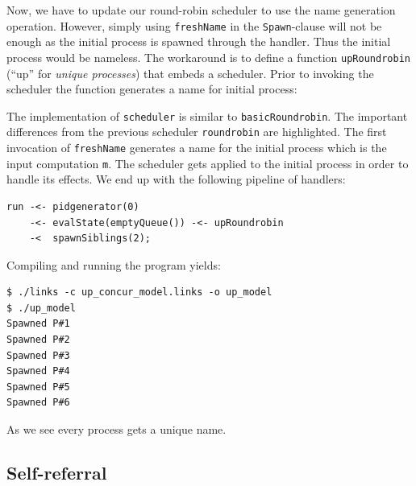 \documentclass[12pt,mscres,cdtppar,twoside,openright,logo,rightchapter,normalheadings]{infthesis}
\newcommand{\snippet}[1]{}
\theoremstyle{definition}
\begin{document}

Now, we have to update our round-robin scheduler to use the name
generation operation. However, simply using \lstinline$freshName$ in
the \lstinline$Spawn$-clause will not be enough as the initial process
is spawned through the handler. Thus the initial process would be
nameless. The workaround is to define a function
\lstinline$upRoundrobin$ (``up'' for \emph{unique processes}) that
embeds a scheduler. Prior to invoking the scheduler the function
generates a name for initial process:
%

%
The implementation of \lstinline$scheduler$ is similar to
\lstinline$basicRoundrobin$. The important differences from the
previous scheduler \lstinline$roundrobin$ are highlighted.  The first
invocation of \lstinline$freshName$ generates a name for the initial
process which is the input computation \lstinline$m$. The scheduler
gets applied to the initial process in order to handle its effects. We
end up with the following pipeline of handlers:
%
\begin{lstlisting}
run -<- pidgenerator(0)
    -<- evalState(emptyQueue()) -<- upRoundrobin 
    -<  spawnSiblings(2);
\end{lstlisting}
%
Compiling and running the program yields:
%
\begin{lstlisting}[style=terminal]
$ ./links -c up_concur_model.links -o up_model
$ ./up_model
Spawned P#1
Spawned P#2
Spawned P#3
Spawned P#4
Spawned P#5
Spawned P#6
\end{lstlisting}
%
As we see every process gets a unique name.

\subsection{Self-referral}
\end{document}
